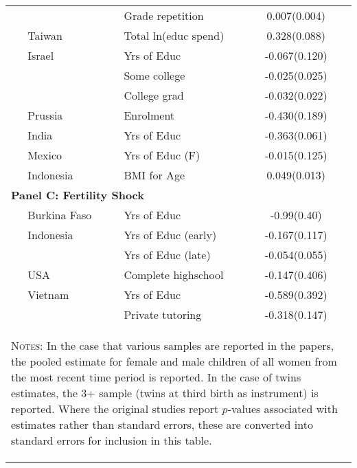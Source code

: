 \begin{table}[htpb!]
\begin{tabular}{lllc}
                                 &         &Grade repetition     &0.007(0.004)  \\
\citet{Lee2008}                  &Taiwan   &Total ln(educ spend) &0.328(0.088)  \\
\citet{Angristetal2010}          &Israel   &Yrs of Educ          &-0.067(0.120)\\
                                 &         &Some college         &-0.025(0.025)\\
                                 &         &College grad         &-0.032(0.022)\\
\citet{Beckeretal2010}           &Prussia  &Enrolment            &-0.430(0.189)\\
\citet{KumarKugler2011}          &India    &Yrs of Educ          &-0.363(0.061)\\
\citet{FitzsimonsMalde2014}      &Mexico   &Yrs of Educ (F)      &-0.015(0.125)\\ 
\citet{MillimetWang2011}         &Indonesia&BMI for Age          & 0.049(0.013)\\
\midrule
\multicolumn{4}{l}{\textbf{Panel C: Fertility Shock}} \\
\citet{Bougmaetal2015}           &Burkina Faso&Yrs of Educ        &-0.99(0.40)\\ 
\citet{Marlani2008}              &Indonesia   &Yrs of Educ (early)&-0.167(0.117)\\ 
                                 &            &Yrs of Educ (late) &-0.054(0.055)\\
\citet{Hotzetal1997}             &USA         &Complete highschool&-0.147(0.406)\\
\citet{DangRogers2013}           &Vietnam     &Yrs of Educ        &-0.589(0.392)\\
                                 &            &Private tutoring   &-0.318(0.147)\\
\bottomrule
\multicolumn{4}{p{12.9cm}}{\begin{footnotesize}\textsc{Notes:} In the case that 
various samples are reported in the papers, the pooled estimate for female and
male children of all women from the most recent time period is reported. In the 
case of twins estimates, the 3+ sample (twins at third birth as instrument) is
reported.  Where the original studies report $p$-values associated with estimates 
rather than standard errors, these are converted into standard errors for 
inclusion in this table.
\end{footnotesize}}
\end{tabular}     
\end{table}


